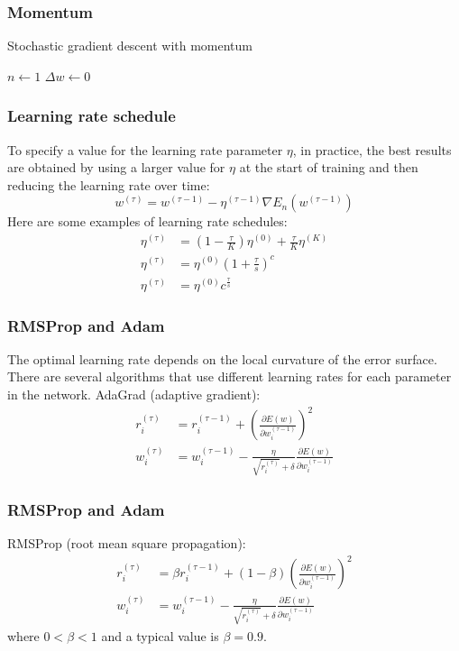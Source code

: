 \documentclass{beamer}
\begin{document}
\begin{frame}
    \frametitle{Momentum}
    \begin{algorithm}[H]
        \caption{Stochastic gradient descent with momentum}
        $n\gets{}1$\;
        $\Delta{}w\gets{}0$\;
        \;
    \end{algorithm}
\end{frame}

\begin{frame}
    \frametitle{Learning rate schedule}
    To specify a value for the learning rate parameter $\eta$, in practice, the best results are obtained by using a larger value for $\eta$ at the start of training and then reducing the learning rate over time:
    \begin{equation*}
        w^{(\tau)}=w^{(\tau-1)}-\eta^{(\tau-1)}\nabla{}E_{n}(w^{(\tau-1)})
    \end{equation*}
    Here are some examples of learning rate schedules:
    \begin{align*}
        \eta^{(\tau)}&=(1-\frac{\tau}{K})\eta^{(0)}+\frac{\tau}{K}\eta^{(K)} \\
        \eta^{(\tau)}&=\eta^{(0)}(1+\frac{\tau}{s})^{c} \\
        \eta^{(\tau)}&=\eta^{(0)}c^{\frac{\tau}{s}}
    \end{align*}
\end{frame}

\begin{frame}
    \frametitle{RMSProp and Adam}
    The optimal learning rate depends on the local curvature of the error surface. There are several algorithms that use different learning rates for each parameter in the network.
    \bigbreak
    AdaGrad (adaptive gradient):
    \begin{align*}
        r^{(\tau)}_{i}&=r^{(\tau-1)}_{i}+(\frac{\partial{}E(w)}{\partial{}w^{(\tau-1)}_{i}})^{2} \\
        w^{(\tau)}_{i}&=w^{(\tau-1)}_{i}-\frac{\eta}{\sqrt{r^{(\tau)}_{i}}+\delta}\frac{\partial{}E(w)}{\partial{}w^{(\tau-1)}_{i}}
    \end{align*}
\end{frame}

\begin{frame}
    \frametitle{RMSProp and Adam}
    RMSProp (root mean square propagation):
    \begin{align*}
        r^{(\tau)}_{i}&=\beta{}r^{(\tau-1)}_{i}+(1-\beta)(\frac{\partial{}E(w)}{\partial{}w^{(\tau-1)}_{i}})^{2} \\
        w^{(\tau)}_{i}&=w^{(\tau-1)}_{i}-\frac{\eta}{\sqrt{r^{(\tau)}_{i}}+\delta}\frac{\partial{}E(w)}{\partial{}w^{(\tau-1)}_{i}}
    \end{align*}
    where $0<\beta<1$ and a typical value is $\beta=0.9$.
\end{frame}
\end{document}
